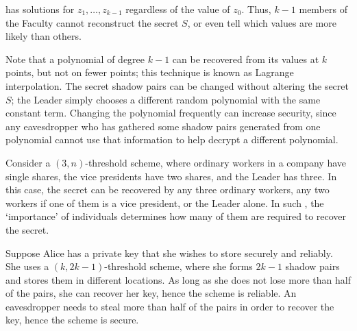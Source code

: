 has solutions for $z_1, \dots, z_{k-1}$ regardless of the value of $z_0$.
Thus, $k - 1$ members of the Faculty cannot reconstruct the secret $S$, or even tell which values are more likely than others.
\begin{remark}
    Note that a polynomial of degree $k - 1$ can be recovered from its values at $k$ points, but not on fewer points; this technique is known as Lagrange interpolation.
    The secret shadow pairs can be changed without altering the secret $S$; the Leader simply chooses a different random polynomial with the same constant term.
    Changing the polynomial frequently can increase security, since any eavesdropper who has gathered some shadow pairs generated from one polynomial cannot use that information to help decrypt a different polynomial.
\end{remark}
\begin{example}
    Consider a $(3, n)$-threshold scheme, where ordinary workers in a company have single shares, the vice presidents have two shares, and the Leader has three.
    In this case, the secret can be recovered by any three ordinary workers, any two workers if one of them is a vice president, or the Leader alone.
    In such , the `importance' of individuals determines how many of them are required to recover the secret.
\end{example}
\begin{example}
    Suppose Alice has a private key that she wishes to store securely and reliably.
    She uses a $(k, 2k-1)$-threshold scheme, where she forms $2k-1$ shadow pairs and stores them in different locations.
    As long as she does not lose more than half of the pairs, she can recover her key, hence the scheme is reliable.
    An eavesdropper needs to steal more than half of the pairs in order to recover the key, hence the scheme is secure.
\end{example}
